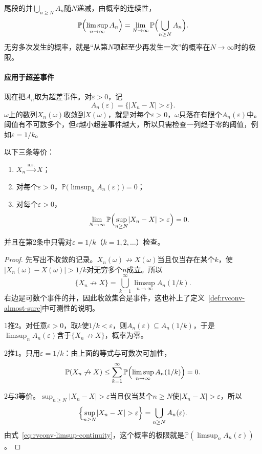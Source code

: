 尾段的并$\bigcup_{n\geq N}A_n$随$N$递减，由概率的连续性，
\begin{equation}
 \mathbb{P}\Bigl(\limsup_{n\to\infty}A_n\Bigr)=\lim_{N\to\infty}\mathbb{P}\Bigl(\bigcup_{n\geq N}A_n\Bigr) .
 \label{eq:rvconv-limsup-continuity}
\end{equation}
无穷多次发生的概率，就是“从第$N$项起至少再发生一次”的概率在$N\to\infty$时的极限。

\paragraph{应用于超差事件}
现在把$A_n$取为超差事件。对$\varepsilon>0$，记
\[
 A_n(\varepsilon)=\bigl\{\lvert X_n-X\rvert>\varepsilon\bigr\}.
\]
$\omega$上的数列$X_n(\omega)$收敛到$X(\omega)$，就是对每个$\varepsilon>0$，$\omega$只落在有限个$A_n(\varepsilon)$中。阈值有不可数多个，但$\varepsilon$越小超差事件越大，所以只需检查一列趋于零的阈值，例如$\varepsilon=1/k$。

\begin{theorem}[几乎必然收敛的事件判据]
\label{thm:rvconv-as-io}
以下三条等价：
\begin{enumerate}
 \item $X_n\xrightarrow{\mathrm{a.s.}}X$；
 \item 对每个$\varepsilon>0$，$\mathbb{P}\bigl(\limsup_nA_n(\varepsilon)\bigr)=0$；
 \item 对每个$\varepsilon>0$，
 \begin{equation}
  \lim_{N\to\infty}\mathbb{P}\Bigl(\sup_{n\geq N}\lvert X_n-X\rvert>\varepsilon\Bigr)=0 .
  \label{eq:rvconv-as-sup}
 \end{equation}
\end{enumerate}
并且在第2条中只需对$\varepsilon=1/k$（$k=1,2,\dots$）检查。
\end{theorem}

\begin{proof}
先写出不收敛的记录。$X_n(\omega)\not\to X(\omega)$当且仅当存在某个$k$，使$\lvert X_n(\omega)-X(\omega)\rvert>1/k$对无穷多个$n$成立。所以
\[
 \{X_n\not\to X\}=\bigcup_{k=1}^{\infty}\limsup_{n\to\infty}A_n(1/k) .
\]
右边是可数个事件的并，因此收敛集合是事件，这也补上了定义~\ref{def:rvconv-almost-sure}中可测性的说明。

1推2。对任意$\varepsilon>0$，取$k$使$1/k<\varepsilon$，则$A_n(\varepsilon)\subseteq A_n(1/k)$，于是$\limsup_nA_n(\varepsilon)$含于$\{X_n\not\to X\}$，概率为零。

2推1。只用$\varepsilon=1/k$：由上面的等式与可数次可加性，
\[
 \mathbb{P}(X_n\not\to X)\leq\sum_{k=1}^{\infty}\mathbb{P}\Bigl(\limsup_{n\to\infty}A_n(1/k)\Bigr)=0 .
\]

2与3等价。$\sup_{n\geq N}\lvert X_n-X\rvert>\varepsilon$当且仅当某个$n\geq N$使$\lvert X_n-X\rvert>\varepsilon$，所以
\[
 \Bigl\{\sup_{n\geq N}\lvert X_n-X\rvert>\varepsilon\Bigr\}=\bigcup_{n\geq N}A_n(\varepsilon) .
\]
由式~\eqref{eq:rvconv-limsup-continuity}，这个概率的极限就是$\mathbb{P}(\limsup_nA_n(\varepsilon))$。
\end{proof}


